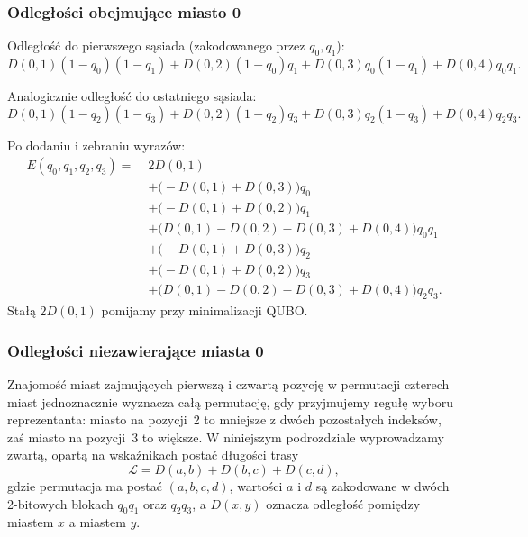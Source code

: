\subsubsection{Odległości obejmujące miasto 0}

Odległość do pierwszego sąsiada (zakodowanego przez $q_0,q_1$):
\begin{equation}
D(0,1)(1-q_0)(1-q_1)
+ D(0,2)(1-q_0)q_1
+ D(0,3)q_0(1-q_1)
+ D(0,4)q_0q_1.
\end{equation}

Analogicznie odległość do ostatniego sąsiada:
\begin{equation}
D(0,1)(1-q_2)(1-q_3)
+ D(0,2)(1-q_2)q_3
+ D(0,3)q_2(1-q_3)
+ D(0,4)q_2q_3.
\end{equation}

Po dodaniu i zebraniu wyrazów:
\begin{equation}
\begin{aligned}
E(q_0,q_1,q_2,q_3) =\;& 2D(0,1) \\
&+ \big(-D(0,1)+D(0,3)\big)q_0 \\
&+ \big(-D(0,1)+D(0,2)\big)q_1 \\
&+ \big(D(0,1)-D(0,2)-D(0,3)+D(0,4)\big)q_0q_1 \\
&+ \big(-D(0,1)+D(0,3)\big)q_2 \\
&+ \big(-D(0,1)+D(0,2)\big)q_3 \\
&+ \big(D(0,1)-D(0,2)-D(0,3)+D(0,4)\big)q_2q_3.
\end{aligned}
\end{equation}
Stałą $2D(0,1)$ pomijamy przy minimalizacji QUBO.

\subsubsection{Odległości niezawierające miasta 0}

Znajomość miast zajmujących pierwszą i czwartą pozycję w permutacji czterech miast jednoznacznie wyznacza całą permutację, gdy przyjmujemy regułę wyboru reprezentanta: miasto na pozycji~2 to mniejsze z dwóch pozostałych indeksów, zaś miasto na pozycji~3 to większe. W niniejszym podrozdziale wyprowadzamy zwartą, opartą na wskaźnikach postać długości trasy
\begin{equation}
\mathcal{L} = D(a,b)+D(b,c)+D(c,d),
\end{equation}
gdzie permutacja ma postać $(a,b,c,d)$, wartości $a$ i $d$ są zakodowane w dwóch 2-bitowych blokach $q_0q_1$ oraz $q_2q_3$, a $D(x,y)$ oznacza odległość pomiędzy miastem $x$ a miastem $y$.

